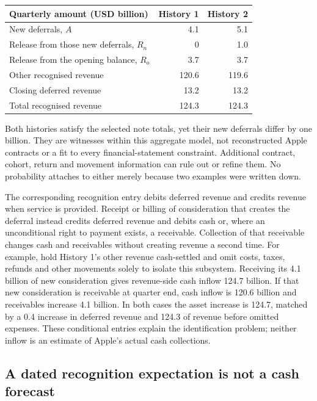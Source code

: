 \begin{center}
\begin{tabularx}{\linewidth}{@{}Xrr@{}}
\toprule
Quarterly amount (USD billion) & History 1 & History 2\\\midrule
New deferrals, $A$ & 4.1 & 5.1\\
Release from those new deferrals, $R_n$ & 0 & 1.0\\
Release from the opening balance, $R_o$ & 3.7 & 3.7\\
Other recognised revenue & 120.6 & 119.6\\
Closing deferred revenue & 13.2 & 13.2\\
Total recognised revenue & 124.3 & 124.3\\\bottomrule
\end{tabularx}
\end{center}

Both histories satisfy the selected note totals, yet their new deferrals differ
by one billion. They are witnesses within this aggregate model, not reconstructed
Apple contracts or a fit to every financial-statement constraint. Additional
contract, cohort, return and movement information can rule out or refine them.
No probability attaches to either merely because two examples were written down.

The corresponding recognition entry debits deferred revenue and credits revenue
when service is provided. Receipt or billing of consideration that creates the
deferral instead credits deferred revenue and debits cash or, where an
unconditional right to payment exists, a receivable. Collection of that
receivable changes cash and receivables without creating revenue a second time.
For example, hold History 1's other revenue cash-settled and omit costs, taxes,
refunds and other movements solely to isolate this subsystem. Receiving its
4.1 billion of new consideration gives revenue-side cash inflow 124.7 billion.
If that new consideration is receivable at quarter end, cash inflow is 120.6
billion and receivables increase 4.1 billion. In both cases the asset increase
is 124.7, matched by a 0.4 increase in deferred revenue and 124.3 of revenue
before omitted expenses. These conditional entries explain the identification
problem; neither inflow is an estimate of Apple's actual cash collections.

\subsection{A dated recognition expectation is not a cash forecast}

